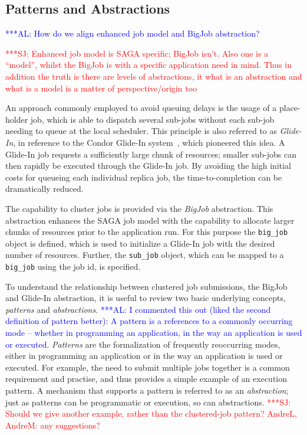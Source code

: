 \documentclass{rspublic}
\newcommand{\alnote}[1]{ {\textcolor{blue} { ***AL: #1 }}}
\newcommand{\jhanote}[1]{ {\textcolor{red} { ***SJ: #1 }}}
\newcommand{\alnote}[1]{}
\newcommand{\jhanote}[1]{}
\newcommand{\I}[1]{\textit{#1}}
\begin{document}
               
\subsection{Patterns and Abstractions}
\alnote{How do we align enhanced job model and BigJob abstraction?}

\jhanote{Enhanced job model is SAGA specific; BigJob isn't. Also one
  is a ``model'', whilst the BigJob is with a specific application
  need in mind. Thus in addition the truth is there are levels of
  abstractions, it what is an abstraction and what is a model is a
  matter of perspective/origin too}              

An approach commonly employed to avoid queuing delays is the usage of
a place-holder job, which is able to dispatch several sub-jobs without
each sub-job needing to queue at the local scheduler. This principle
is also referred to as \emph{Glide-In}, in reference to the Condor
Glide-In system~\citep{citeulike:291860}, which pioneered this idea. A
Glide-In job requests a sufficiently large chunk of resources; smaller
sub-jobs can then rapidly be executed through the Glide-In job.  By
avoiding the high initial costs for queueing each individual replica
job, the time-to-completion can be dramatically reduced.

The capability to cluster jobs is provided via the \emph{BigJob}
abstraction. This abstraction enhances the SAGA job model with the
capability to allocate larger chunks of resources prior to the
application run. For this purpose the \texttt{big\_job} object is
defined, which is used to initialize a Glide-In job with the desired
number of resources.  Further, the \texttt{sub\_job} object, which can
be mapped to a \texttt{big\_job} using the job id, is specified.

To understand the relationship between clustered job submissions, the
BigJob and Gli\-de-In abstraction, it is useful to review two basic
underlying concepts, \I{patterns} and \I{abstractions}.  \alnote{I commented this out (liked the second definition
  of pattern better): A pattern is a references to a commonly
  occurring mode -- whether in programming an application, in the way
  an application is used or executed.}  \I{Patterns} are the formalization
of frequently reoccurring modes, either in programming an
application or in the way an application is used or executed.
For example, the need to submit multiple jobs together is a common
requirement and practise, and thus provides a simple example of an
execution pattern.  A mechanism that supports a pattern is referred to
as an \I{abstraction}; just as patterns can be programmatic or execution,
so can abstractions.  \jhanote{Should we give another example, rather
  than the clustered-job pattern? AndreL, AndreM: any suggestions?}
\end{document}
